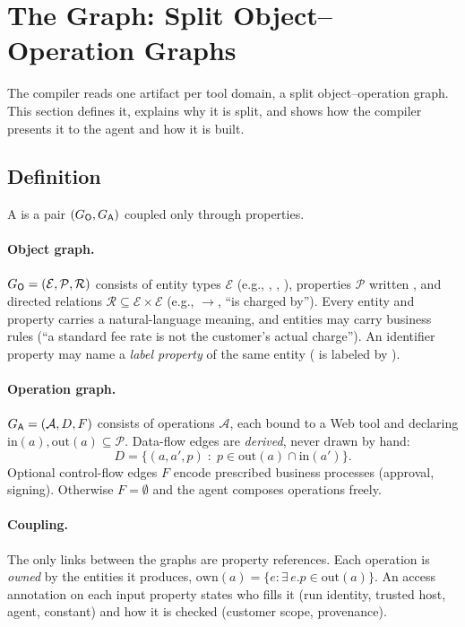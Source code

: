 \section{The Graph: Split Object--Operation Graphs}
\label{sec:sog}

The compiler reads one artifact per tool domain, a split object--operation graph. This section defines it, explains why it is split, and shows how the compiler presents it to the agent and how it is built.

\subsection{Definition}
A \sog is a pair $(G_{\mathsf{O}},G_{\mathsf{A}})$ coupled only through properties.

\paragraph{Object graph.} $G_{\mathsf{O}}=(\mathcal{E},\mathcal{P},\mathcal{R})$ consists of entity types $\mathcal{E}$ (e.g., , , ), properties $\mathcal{P}$ written , and directed relations $\mathcal{R}\subseteq\mathcal{E}\times\mathcal{E}$ (e.g., $\to$, ``is charged by''). Every entity and property carries a natural-language meaning, and entities may carry business rules (``a standard fee rate is not the customer's actual charge''). An identifier property may name a \emph{label property} of the same entity ( is labeled by ).

\paragraph{Operation graph.} $G_{\mathsf{A}}=(\mathcal{A}, D, F)$ consists of operations $\mathcal{A}$, each bound to a Web tool and declaring $\mathrm{in}(a),\mathrm{out}(a)\subseteq\mathcal{P}$. Data-flow edges are \emph{derived}, never drawn by hand:
\begin{equation}
D=\{(a,a',p)\;:\;p\in\mathrm{out}(a)\cap\mathrm{in}(a')\}.
\end{equation}
Optional control-flow edges $F$ encode prescribed business processes (approval, signing). Otherwise $F=\emptyset$ and the agent composes operations freely.

\paragraph{Coupling.} The only links between the graphs are property references. Each operation is \emph{owned} by the entities it produces, $\mathrm{own}(a)=\{e:\exists\,e.p\in\mathrm{out}(a)\}$. An access annotation on each input property states who fills it (run identity, trusted host, agent, constant) and how it is checked (customer scope, provenance).

